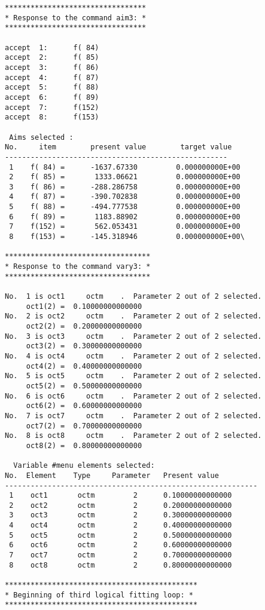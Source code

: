 \begin{footnotesize}
\begin{verbatim}
*********************************
* Response to the command aim3: *
*********************************

accept  1:      f( 84)
accept  2:      f( 85)
accept  3:      f( 86)
accept  4:      f( 87)
accept  5:      f( 88)
accept  6:      f( 89)
accept  7:      f(152)
accept  8:      f(153)

 Aims selected :
No.     item        present value        target value
----------------------------------------------------
 1    f( 84) =      -1637.67330         0.000000000E+00
 2    f( 85) =       1333.06621         0.000000000E+00
 3    f( 86) =      -288.286758         0.000000000E+00
 4    f( 87) =      -390.702838         0.000000000E+00
 5    f( 88) =      -494.777538         0.000000000E+00
 6    f( 89) =       1183.88902         0.000000000E+00
 7    f(152) =       562.053431         0.000000000E+00
 8    f(153) =      -145.318946         0.000000000E+00\

**********************************
* Response to the command vary3: *
**********************************

No.  1 is oct1     octm    .  Parameter 2 out of 2 selected.
     oct1(2) =  0.10000000000000
No.  2 is oct2     octm    .  Parameter 2 out of 2 selected.
     oct2(2) =  0.20000000000000
No.  3 is oct3     octm    .  Parameter 2 out of 2 selected.
     oct3(2) =  0.30000000000000
No.  4 is oct4     octm    .  Parameter 2 out of 2 selected.
     oct4(2) =  0.40000000000000
No.  5 is oct5     octm    .  Parameter 2 out of 2 selected.
     oct5(2) =  0.50000000000000
No.  6 is oct6     octm    .  Parameter 2 out of 2 selected.
     oct6(2) =  0.60000000000000
No.  7 is oct7     octm    .  Parameter 2 out of 2 selected.
     oct7(2) =  0.70000000000000
No.  8 is oct8     octm    .  Parameter 2 out of 2 selected.
     oct8(2) =  0.80000000000000

  Variable #menu elements selected:
No.  Element    Type     Parameter   Present value
-----------------------------------------------------------
 1    oct1       octm         2      0.10000000000000
 2    oct2       octm         2      0.20000000000000
 3    oct3       octm         2      0.30000000000000
 4    oct4       octm         2      0.40000000000000
 5    oct5       octm         2      0.50000000000000
 6    oct6       octm         2      0.60000000000000
 7    oct7       octm         2      0.70000000000000
 8    oct8       octm         2      0.80000000000000

*********************************************
* Beginning of third logical fitting loop: *
*********************************************


\end{verbatim}
\end{footnotesize}
